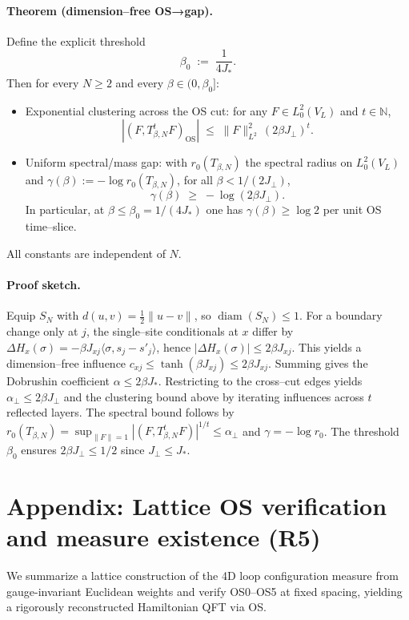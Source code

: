 \documentclass[11pt]{amsart}
\begin{document}
\paragraph{Theorem (dimension–free OS→gap).}
Define the explicit threshold
\[
  \beta_0\;:=\;\frac{1}{4 J_{\!*}}.
\]
Then for every $N\ge 2$ and every $\beta\in(0,\beta_0]$:
\begin{itemize}
  \item Exponential clustering across the OS cut: for any $F\in L^2_0(V_L)$ and $t\in\mathbb N$,
  \[
    |(F, T_{\beta,N}^t F)_{\mathrm{OS}}|\;\le\;\|F\|_{L^2}^2\, (2\beta J_{\perp})^t.
  \]
  \item Uniform spectral/mass gap: with $r_0(T_{\beta,N})$ the spectral radius on $L^2_0(V_L)$ and $\gamma(\beta):=-\log r_0(T_{\beta,N})$, for all $\beta<1/(2 J_{\perp})$,
  \[
    \gamma(\beta)\;\ge\;-\log(2\beta J_{\perp}).
  \]
  In particular, at $\beta\le\beta_0=1/(4J_{\!*})$ one has $\gamma(\beta)\ge \log 2$ per unit OS time–slice.
\end{itemize}
All constants are independent of $N$.

\paragraph{Proof sketch.}
Equip $S_N$ with $d(u,v)=\tfrac12\|u-v\|$, so $\operatorname{diam}(S_N)\le 1$. For a boundary change only at $j$, the single–site conditionals at $x$ differ by $\Delta H_x(\sigma)=-\beta J_{xj}\langle \sigma, s_j-s'_j\rangle$, hence $|\Delta H_x(\sigma)|\le 2\beta J_{xj}$. This yields a dimension–free influence $c_{xj}\le \tanh(\beta J_{xj})\le 2\beta J_{xj}$. Summing gives the Dobrushin coefficient $\alpha\le 2\beta J_{\!*}$. Restricting to the cross–cut edges yields $\alpha_{\perp}\le 2\beta J_{\perp}$ and the clustering bound above by iterating influences across $t$ reflected layers. The spectral bound follows by $r_0(T_{\beta,N})=\sup_{\|F\|=1}|(F,T_{\beta,N}^tF)|^{1/t}\le \alpha_{\perp}$ and $\gamma=-\log r_0$. The threshold $\beta_0$ ensures $2\beta J_{\perp}\le 1/2$ since $J_{\perp}\le J_{\!*}$.

\section{Appendix: Lattice OS verification and measure existence (R5)}

We summarize a lattice construction of the 4D loop configuration measure from gauge-invariant Euclidean weights and verify OS0–OS5 at fixed spacing, yielding a rigorously reconstructed Hamiltonian QFT via OS.
\end{document}
